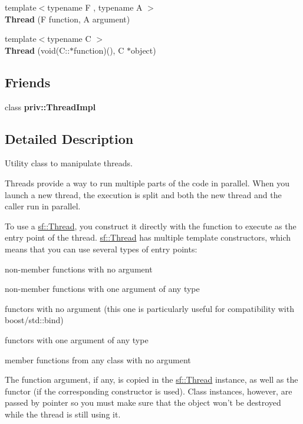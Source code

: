 \begin{DoxyCompactItemize}
\item 
\hypertarget{classsf_1_1Thread_a719b2cc067d92d52c35064a49d850a53}{{\footnotesize template$<$typename F , typename A $>$ }\\{\bfseries Thread} (F function, A argument)}\label{classsf_1_1Thread_a719b2cc067d92d52c35064a49d850a53}

\item 
\hypertarget{classsf_1_1Thread_aa9f473c8cbb078900c62b1fd14a83a34}{{\footnotesize template$<$typename C $>$ }\\{\bfseries Thread} (void(C\-::$\ast$function)(), C $\ast$object)}\label{classsf_1_1Thread_aa9f473c8cbb078900c62b1fd14a83a34}

\end{DoxyCompactItemize}
\subsection*{Friends}
\begin{DoxyCompactItemize}
\item 
\hypertarget{classsf_1_1Thread_a5ed4f3acfcb44de47de196437c39f9ef}{class {\bfseries priv\-::\-Thread\-Impl}}\label{classsf_1_1Thread_a5ed4f3acfcb44de47de196437c39f9ef}

\end{DoxyCompactItemize}


\subsection{Detailed Description}
Utility class to manipulate threads. 

Threads provide a way to run multiple parts of the code in parallel. When you launch a new thread, the execution is split and both the new thread and the caller run in parallel.

To use a \hyperlink{classsf_1_1Thread}{sf\-::\-Thread}, you construct it directly with the function to execute as the entry point of the thread. \hyperlink{classsf_1_1Thread}{sf\-::\-Thread} has multiple template constructors, which means that you can use several types of entry points\-: \begin{DoxyItemize}
\item non-\/member functions with no argument \item non-\/member functions with one argument of any type \item functors with no argument (this one is particularly useful for compatibility with boost/std\-::bind) \item functors with one argument of any type \item member functions from any class with no argument\end{DoxyItemize}
The function argument, if any, is copied in the \hyperlink{classsf_1_1Thread}{sf\-::\-Thread} instance, as well as the functor (if the corresponding constructor is used). Class instances, however, are passed by pointer so you must make sure that the object won't be destroyed while the thread is still using it.

